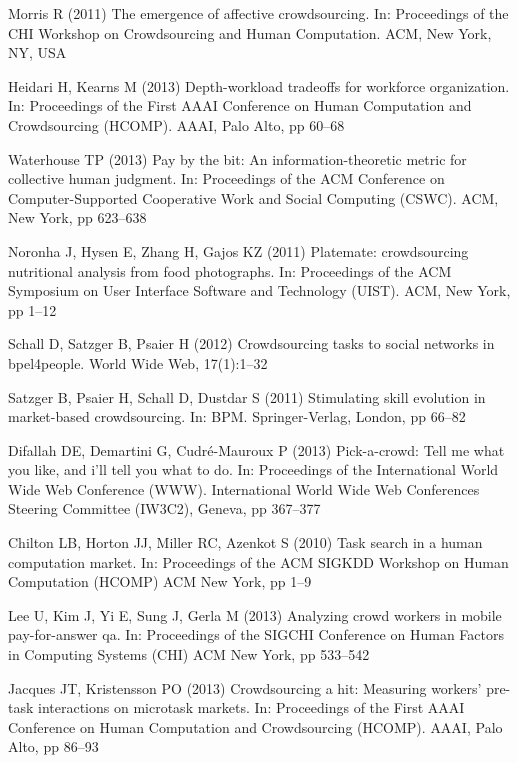 \documentclass[11pt]{bmc_article_s50}
\begin{document}
\begin{thebibliography}{000}
Morris R (2011)
{The emergence of affective crowdsourcing.}
In: {Proceedings of the CHI Workshop on Crowdsourcing and Human Computation}.
{ACM},
{New York, NY, USA}

Heidari H,
Kearns M (2013)
{Depth-workload tradeoffs for workforce organization}.
In: {Proceedings of the First AAAI Conference on Human Computation and
  Crowdsourcing (HCOMP)}.
{AAAI},
{Palo Alto},
pp 60--{68}



Waterhouse TP (2013)
{Pay by the bit: An information-theoretic metric for collective human
  judgment}.
In: {Proceedings of the ACM Conference on Computer-Supported
  Cooperative Work and Social Computing (CSWC)}.
{ACM},
{New York},
pp 623--{638}

Noronha J,
Hysen E,
Zhang H,
Gajos KZ (2011)
{Platemate: crowdsourcing nutritional analysis from food photographs}.
In: {Proceedings of the ACM Symposium on User Interface Software and
  Technology (UIST)}.
{ACM},
{New York},
pp 1--{12}

Schall D,
Satzger B,
Psaier H (2012)
{Crowdsourcing tasks to social networks in bpel4people}.
{World Wide Web},
{17}(1):1--{32}



Satzger B,
Psaier H,
Schall D,
Dustdar S (2011)
{Stimulating skill evolution in market-based crowdsourcing}.
In: {BPM}.
{Springer-Verlag},
{London},
pp 66--{82}

Difallah DE,
Demartini G,
Cudr\'e-Mauroux P (2013)
{Pick-a-crowd: Tell me what you like, and i'll tell you what to do}.
In: {Proceedings of the International World Wide Web Conference (WWW)}.
{International World Wide Web Conferences Steering Committee (IW3C2)},
{Geneva},
pp 367--{377}


Chilton LB,
Horton JJ,
Miller RC,
Azenkot S (2010)
{Task search in a human computation market}.
In: {Proceedings of the ACM SIGKDD Workshop on Human Computation
  (HCOMP)}
{ACM}
{New York},
pp 1--{9}

Lee U,
Kim J,
Yi E,
Sung J,
Gerla M (2013)
{Analyzing crowd workers in mobile pay-for-answer qa}.
In: {Proceedings of the SIGCHI Conference on Human Factors in Computing
  Systems (CHI)}
{ACM}
{New York},
pp 533--{542}

Jacques JT,
Kristensson PO (2013)
{Crowdsourcing a hit: Measuring workers' pre-task interactions on
  microtask markets}.
In: {Proceedings of the First AAAI Conference on Human Computation and
  Crowdsourcing (HCOMP)}.
{AAAI},
{Palo Alto},
pp 86--{93}



\end{thebibliography}
\end{document}
